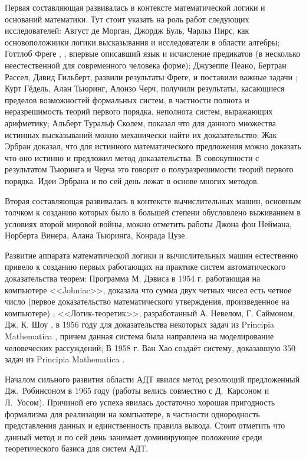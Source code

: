 Первая составляющая развивалась в контексте математической логики и оснований математики. Тут стоит указать на роль работ следующих исследователей: Август де Морган, Джордж Буль, Чарльз Пирс, как основоположники логики высказывания и исследователи в области алгебры; Готтлоб Фреге \cite{Frege}, \cite{Sourcebook}, впервые описавший язык и исчисление предикатов (в несколько неестественной для современного человека форме); Джузеппе Пеано, Бертран Рассел, Давид Гильберт, развили результаты Фреге, и поставили важные задачи \cite{GilbertAkkerman}; Курт Гёдель, Алан Тьюринг, Алонзо Черч, получили результаты, касающиеся пределов возможностей формальных систем, в частности полнота \cite{Godel1929} и неразрешимость теорий первого порядка, неполнота систем, выражающих арифметику; Альберт Туральф Сколем, показал что для данного множества истинных высказываний можно механически найти их доказательство; Жак Эрбран доказал, что для истинного математического предложения можно доказать что оно истинно и предложил метод доказательства. В совокупности с результатом Тьюринга и Черча это говорит о полуразрешимости теорий первого порядка.
Идеи Эрбрана и по сей день лежат в основе многих методов.

Вторая составляющая развивалась в контексте вычислительных машин, основным толчком к созданию которых было в большей степени обусловлено выживанием в условиях второй мировой войны, можно отметить работы Джона фон Неймана, Норберта Винера, Алана Тьюринга, Конрада Цузе.

Развитие аппарата математической логики и вычислительных машин естественно привело к созданию первых работающих на практике систем автоматического доказательства теорем: Программа М. Дэвиса в 1954 г. работающая на компьютере <<Johniac>>, доказала что сумма двух четных чисел есть четное число (первое доказательство математического утверждения, произведенное на компьютере) \cite{LogicComp}; <<Логик-теоретик>>, разработанный А. Невелом, Г. Саймоном, Дж. К. Шоу \cite{Newell1}, \cite{Newell2} в 1956 году для доказательства некоторых задач из Principia Mathematica \cite{PrinMat}, причем данная система была направлена на моделирование человеческих рассуждений; В 1958 г. Ван Хао создаёт систему, доказавшую 350 задач из Principia Mathematica \cite{WangHao}.

Началом сильного развития области АДТ явился метод резолюций \cite{Robinson_1965} предложенный Дж.~Робинсоном в 1965 году (работы велись совместно с Д.~Карсоном и Л.~Уосом). Причиной его успеха явилась достаточно хорошая пригодность формализма для реализации на компьютере, в частности однородность представления данных и единственность правила вывода. Стоит отметить что данный метод и по сей день занимает доминирующее положение среди теоретического базиса для систем АДТ.


